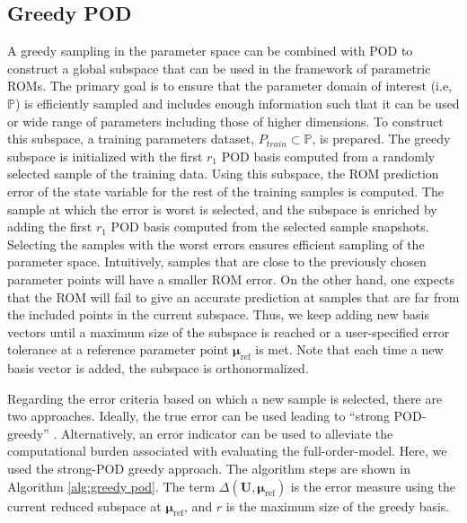 \documentclass[]{interact}
\theoremstyle{plain}%
\theoremstyle{definition}
\theoremstyle{remark}
\begin{document}

\subsection{Greedy POD}
\label{sec:POD}

A greedy sampling in the parameter space \cite{nguyen2009reduced} can be combined with POD to construct a global subspace that can be used in the framework of parametric ROMs.
The primary goal is to ensure that the parameter domain of interest (i.e, $\mathbb P$) is efficiently sampled and includes enough information such that it can be used or wide range of parameters including those of higher dimensions.
To construct this subspace, a training parameters dataset, $P_{train} \subset \mathbb P$, is prepared. 
The greedy subspace is initialized with the first $r_1$ POD basis computed from a randomly selected sample of the training data.
Using this subspace, the ROM prediction error of the state variable for the rest of the training samples is computed.
The sample at which the error is worst is selected, and the subspace is enriched by adding the first $r_1$ POD basis computed from the selected sample snapshots.
Selecting the samples with the worst errors ensures efficient sampling of the parameter space.
Intuitively, samples that are close to the previously chosen parameter points will have a smaller ROM error.
On the other hand, one expects that the ROM will fail to give an accurate prediction at samples that are far from the included points in the current subspace.
Thus, we keep adding new basis vectors until a maximum size of the subspace is reached or a user-specified error tolerance at a reference parameter point $\boldsymbol{\mu}_{\text{ref}}$ is met.
Note that each time a new basis vector is added, the subspace is orthonormalized.

Regarding the error criteria based on which a new sample is selected, there are two approaches. 
Ideally, the true error can be used leading to ``strong POD-greedy'' \cite{benner2017model}.
Alternatively, an error indicator can be used to alleviate the computational burden associated with evaluating the full-order-model. 
Here, we used the strong-POD greedy approach. 
The algorithm steps are shown in Algorithm \ref{alg:greedy pod}. 
The term $\Delta(\textbf{U},\boldsymbol{\mu}_\text{ref})$  is the error measure using the current reduced subspace at $\boldsymbol{\mu}_\text{ref}$, and $r$ is the maximum size of the greedy basis.
\end{document}
